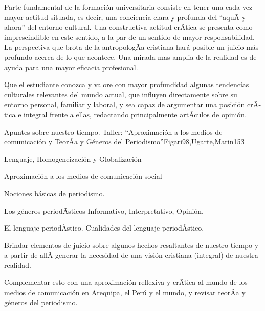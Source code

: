 \begin{syllabus}


\begin{justification}
Parte fundamental de la formación universitaria consiste en tener una cada vez mayor actitud situada, es decir, una conciencia clara y profunda del ``aquÃ­ y ahora'' del entorno cultural.  Una constructiva actitud crÃ­tica se presenta como imprescindible en este sentido, a la par de un sentido de mayor responsabilidad.  La perspectiva que brota de la antropologÃ­a cristiana hará posible un juicio más profundo acerca de lo que acontece.  Una mirada mas amplia de la realidad es de ayuda para una mayor eficacia profesional.
\end{justification}

\begin{goals}
\item Que el estudiante conozca y valore con mayor profundidad algunas tendencias culturales relevantes del mundo actual, que influyen directamente sobre su entorno personal, familiar y laboral, y sea capaz de argumentar una posición crÃ­tica e integral frente a ellas, redactando principalmente artÃ­culos de opinión.
\end{goals}

\begin{outcomes}
\end{outcomes}

\begin{unit}{Apuntes sobre nuestro tiempo. Taller: ``Aproximación a los medios de comunicación y TeorÃ­a y Géneros del Periodismo''}{Figari98,Ugarte,Marin}{15}{3}
\begin{topics}
	\item Lenguaje, Homogeneización y Globalización
	\item Aproximación a los medios de comunicación social
	\item Nociones básicas de periodismo.
	\item Los géneros periodÃ­sticos Informativo, Interpretativo, Opinión.
	\item El lenguaje periodÃ­stico. Cualidades del lenguaje periodÃ­stico.
\end{topics}
\begin{unitgoals}
	\item Brindar elementos de juicio sobre algunos hechos resaltantes de nuestro tiempo y a partir de allÃ­ generar la necesidad de una visión cristiana (integral) de nuestra realidad. 	
	\item Complementar esto con una aproximación reflexiva y crÃ­tica al mundo de los medios de comunicación en Arequipa, el Perú y el mundo, y revisar teorÃ­a y géneros del periodismo.
\end{unitgoals}
\end{unit}


\end{syllabus}
